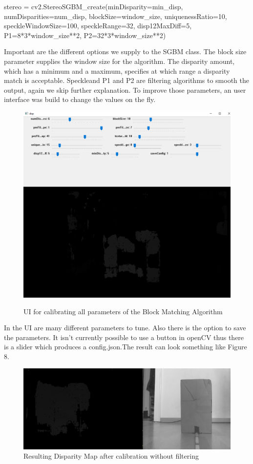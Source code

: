 \documentclass[journal,onecolumn]{IEEEtran}
\begin{document}
\begin{python}
stereo = cv2.StereoSGBM_create(minDisparity=min_disp,
			       numDisparities=num_disp,
			       blockSize=window_size,
			       uniquenessRatio=10,
			       speckleWindowSize=100,
			       speckleRange=32,
			       disp12MaxDiff=5,
			       P1=8*3*window_size**2,
			       P2=32*3*window_size**2)
\end{python}
Important are the different options we supply to the SGBM class. The block size parameter supplies the window size for the algorithm. The disparity amount, which has a minimum and a maximum, specifies at which range a disparity match is acceptable. Speckleand P1 and P2 are filtering algorithms to smooth the output\cite{stereoSGBM}, again we skip further explanation.
To improve those parameters, an user interface was build to change the values on the fly.
\begin{figure}[H]
	\centering
	\includegraphics[scale=0.5]{calibrateUI.png}
	\label{UI}
	\captionsetup{justification=centering}
	\caption{UI for calibrating all parameters of the Block Matching Algorithm}
\end{figure}
\noindent
In the UI are many different parameters to tune. Also there is the option to save the parameters. It isn't currently possible to use a button in openCV thus there is a slider which produces a config.json.The result can look something like Figure 8.
\begin{figure}[H]
	\centering
	\includegraphics[scale=0.5]{disparityMap.png}
	\captionsetup{justification=centering}
	\caption{Resulting Disparity Map after calibration without filtering}
\end{figure}
\end{document}
